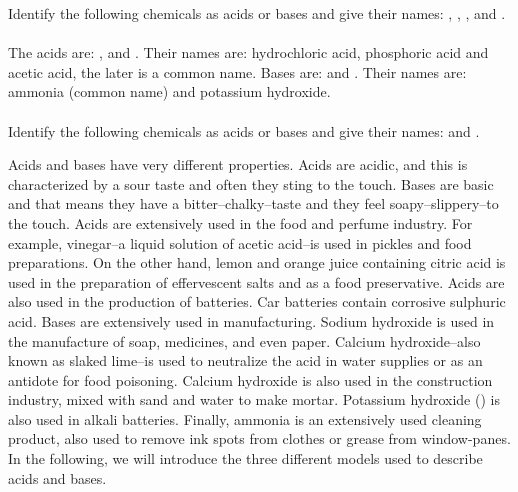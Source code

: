 \documentclass[main.tex]{subfiles}
\begin{document}
\begin{description}
\begin{example} %
Identify the following chemicals as acids or bases and give their names: , , ,  and .
\\
\\
The acids are: ,  and . Their names are: hydrochloric acid, phosphoric acid and acetic acid, the later is a common name. Bases are:  and . Their names are: ammonia (common name) and potassium hydroxide.
\\
\faDiamond\ \\
Identify the following chemicals as acids or bases and give their names:  and .
\\
\end{example}%
\item[\docfilehook{\smallpencil Acids and bases}{Acids and bases}] Acids and bases have very different properties. Acids are acidic, and this is characterized by a sour taste and often they sting to the touch. Bases are basic and that means they have a bitter--chalky--taste and they feel soapy--slippery--to the touch.
Acids are extensively used in the food and perfume industry. For example, vinegar--a liquid solution of acetic acid--is used in pickles and food preparations. On the other hand, lemon and orange juice containing citric acid is used in the preparation of effervescent salts and as a food preservative. Acids are also used in the production of batteries. Car batteries contain corrosive sulphuric acid. Bases are extensively used in manufacturing. Sodium hydroxide is used in the manufacture of soap, medicines, and even paper. Calcium hydroxide--also known as slaked lime--is used to neutralize the acid in water supplies or as an antidote for food poisoning. Calcium hydroxide is also used in the construction industry, mixed with sand and water to make mortar. Potassium hydroxide () is also used in alkali batteries. Finally, ammonia is an extensively used cleaning product, also used to remove ink spots from clothes or grease from window-panes.\\
In the following, we will introduce the three different models used to describe acids and bases.


\end{description}
\end{document}
